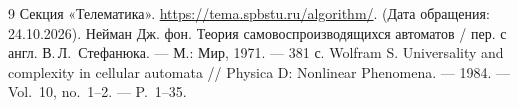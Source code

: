 \newpage
{}
{}
\begin{thebibliography}{9}
	 Секция «Телематика». \url{https://tema.spbstu.ru/algorithm/}. (Дата обращения: 24.10.2026).
	 Нейман Дж. фон. Теория самовоспроизводящихся автоматов / пер. с англ. В.\,Л.~Стефанюка. --- М.: Мир, 1971. --- 381 с.
	 Wolfram S. Universality and complexity in cellular automata // Physica D: Nonlinear Phenomena. --- 1984. --- Vol.~10, no.~1--2. --- P.~1--35.
\end{thebibliography}
